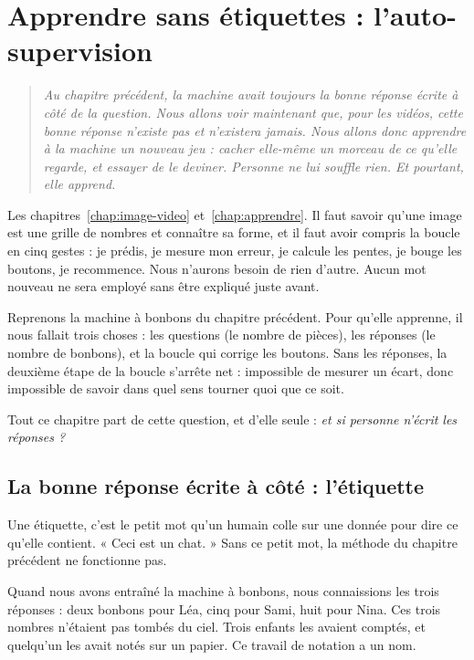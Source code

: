 \chapter{Apprendre sans étiquettes : l'auto-supervision}
\label{chap:auto-supervision}

\begin{quote}\itshape
Au chapitre précédent, la machine avait toujours la bonne réponse écrite à
côté de la question. Nous allons voir maintenant que, pour les vidéos, cette
bonne réponse n'existe pas et n'existera jamais. Nous allons donc apprendre
à la machine un nouveau jeu : cacher elle-même un morceau de ce qu'elle
regarde, et essayer de le deviner. Personne ne lui souffle rien. Et
pourtant, elle apprend.
\end{quote}

\begin{prerequis}
Les chapitres~\ref{chap:image-video} et~\ref{chap:apprendre}. Il faut savoir
qu'une image est une grille de nombres et connaître sa forme, et il faut
avoir compris la boucle en cinq gestes : je prédis, je mesure mon erreur, je
calcule les pentes, je bouge les boutons, je recommence. Nous n'aurons besoin
de rien d'autre. Aucun mot nouveau ne sera employé sans être expliqué juste
avant.
\end{prerequis}

Reprenons la machine à bonbons du chapitre précédent. Pour qu'elle apprenne,
il nous fallait trois choses : les questions (le nombre de pièces), les
réponses (le nombre de bonbons), et la boucle qui corrige les boutons. Sans
les réponses, la deuxième étape de la boucle s'arrête net : impossible de
mesurer un écart, donc impossible de savoir dans quel sens tourner quoi que
ce soit.

Tout ce chapitre part de cette question, et d'elle seule : \emph{et si
personne n'écrit les réponses ?}

\section{La bonne réponse écrite à côté : l'étiquette}

\begin{enclair}
Une étiquette, c'est le petit mot qu'un humain colle sur une donnée pour
dire ce qu'elle contient. « Ceci est un chat. » Sans ce petit mot, la
méthode du chapitre précédent ne fonctionne pas.
\end{enclair}

Quand nous avons entraîné la machine à bonbons, nous connaissions les trois
réponses : deux bonbons pour Léa, cinq pour Sami, huit pour Nina. Ces trois
nombres n'étaient pas tombés du ciel. Trois enfants les avaient comptés, et
quelqu'un les avait notés sur un papier. Ce travail de notation a un nom.

